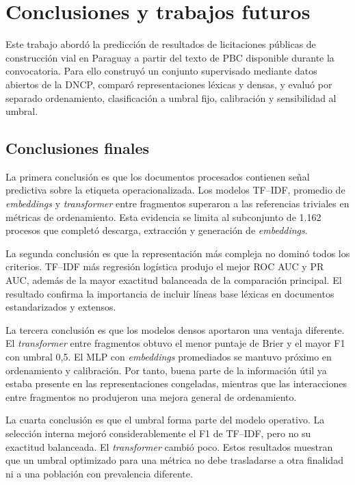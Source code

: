 \clearpage
{}
\chapter{Conclusiones y trabajos futuros}
\label{sec:conclusiones}

Este trabajo abordó la predicción de resultados de licitaciones públicas de construcción vial en Paraguay a partir del texto de PBC disponible durante la convocatoria. Para ello construyó un conjunto supervisado mediante datos abiertos de la DNCP, comparó representaciones léxicas y densas, y evaluó por separado ordenamiento, clasificación a umbral fijo, calibración y sensibilidad al umbral.

\section{Conclusiones finales}

La primera conclusión es que los documentos procesados contienen señal predictiva sobre la etiqueta operacionalizada. Los modelos TF--IDF, promedio de \textit{embeddings} y \textit{transformer} entre fragmentos superaron a las referencias triviales en métricas de ordenamiento. Esta evidencia se limita al subconjunto de 1.162 procesos que completó descarga, extracción y generación de \textit{embeddings}.

La segunda conclusión es que la representación más compleja no dominó todos los criterios. TF--IDF más regresión logística produjo el mejor ROC AUC y PR AUC, además de la mayor exactitud balanceada de la comparación principal. El resultado confirma la importancia de incluir líneas base léxicas en documentos estandarizados y extensos.

La tercera conclusión es que los modelos densos aportaron una ventaja diferente. El \textit{transformer} entre fragmentos obtuvo el menor puntaje de Brier y el mayor F1 con umbral 0,5. El MLP con \textit{embeddings} promediados se mantuvo próximo en ordenamiento y calibración. Por tanto, buena parte de la información útil ya estaba presente en las representaciones congeladas, mientras que las interacciones entre fragmentos no produjeron una mejora general de ordenamiento.

La cuarta conclusión es que el umbral forma parte del modelo operativo. La selección interna mejoró considerablemente el F1 de TF--IDF, pero no su exactitud balanceada. El \textit{transformer} cambió poco. Estos resultados muestran que un umbral optimizado para una métrica no debe trasladarse a otra finalidad ni a una población con prevalencia diferente.

